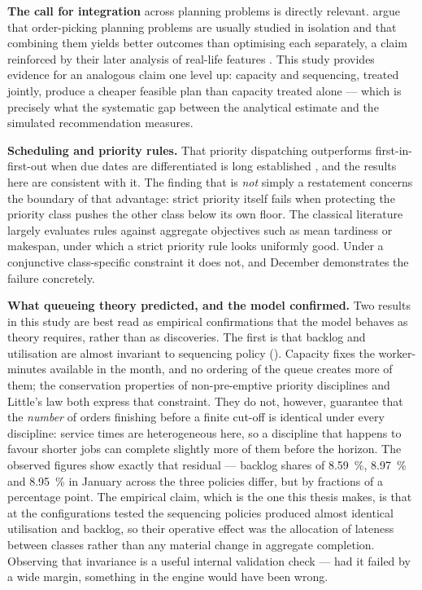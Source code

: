 \textbf{The call for integration} across planning problems is directly relevant.
\citet{vangils2018} argue that order-picking planning problems are usually studied in isolation
and that combining them yields better outcomes than optimising each separately, a claim
reinforced by their later analysis of real-life features \citep{vangils2019}. This study
provides evidence for an analogous claim one level up: capacity and sequencing, treated
jointly, produce a cheaper feasible plan than capacity treated alone --- which is precisely what
the systematic gap between the analytical estimate and the simulated recommendation measures.

\textbf{Scheduling and priority rules.} That priority dispatching outperforms
first-in-first-out when due dates are differentiated is long established
\citep{panwalkar1977}, and the results here are consistent with it. The finding that is
\emph{not} simply a restatement concerns the boundary of that advantage: strict priority itself
fails when protecting the priority class pushes the other class below its own floor. The
classical literature largely evaluates rules against aggregate objectives such as mean tardiness
or makespan, under which a strict priority rule looks uniformly good. Under a conjunctive
class-specific constraint it does not, and December demonstrates the failure concretely.

\textbf{What queueing theory predicted, and the model confirmed.} Two results in this study are
best read as empirical confirmations that the model behaves as theory requires, rather than as
discoveries. The first is that backlog and utilisation are almost invariant to sequencing policy
(). Capacity fixes the worker-minutes available in the month, and no
ordering of the queue creates more of them; the conservation properties of non-pre-emptive
priority disciplines and Little's law \citep{little1961} both express that constraint. They do
not, however, guarantee that the \emph{number} of orders finishing before a finite cut-off is
identical under every discipline: service times are heterogeneous here, so a discipline that
happens to favour shorter jobs can complete slightly more of them before the horizon. The
observed figures show exactly that residual --- backlog shares of \SI{8.59}{\percent},
\SI{8.97}{\percent} and \SI{8.95}{\percent} in January across the three policies differ, but by
fractions of a percentage point. The empirical claim, which is the one this thesis makes, is
that at the configurations tested the sequencing policies produced almost identical utilisation
and backlog, so their operative effect was the allocation of lateness between classes rather
than any material change in aggregate completion. Observing that invariance is a useful internal
validation check --- had it failed by a wide margin, something in the engine would have been
wrong.

